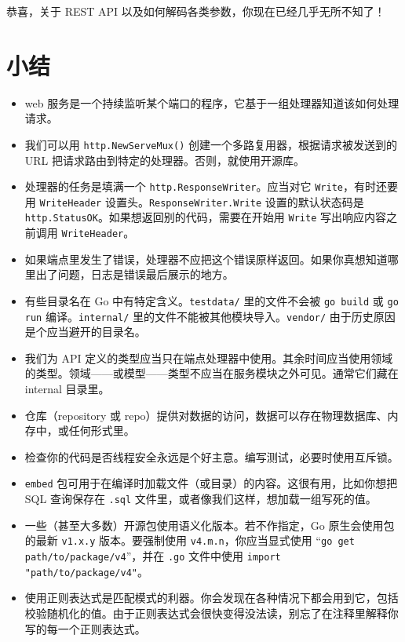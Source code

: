 恭喜，关于 REST API 以及如何解码各类参数，你现在已经几乎无所不知了！

\section*{小结}

\begin{itemize}
\item web 服务是一个持续监听某个端口的程序，它基于一组处理器知道该如何处理请求。
\item 我们可以用 \texttt{http.NewServeMux()} 创建一个多路复用器，根据请求被发送到的 URL 把请求路由到特定的处理器。否则，就使用开源库。

\item 处理器的任务是填满一个 \texttt{http.ResponseWriter}。应当对它 \texttt{Write}，有时还要用 \texttt{WriteHeader} 设置头。\texttt{ResponseWriter.Write} 设置的默认状态码是 \texttt{http.StatusOK}。如果想返回别的代码，需要在开始用 \texttt{Write} 写出响应内容之前调用 \texttt{WriteHeader}。
\item 如果端点里发生了错误，处理器不应把这个错误原样返回。如果你真想知道哪里出了问题，日志是错误最后展示的地方。
\item 有些目录名在 Go 中有特定含义。\texttt{testdata/} 里的文件不会被 \texttt{go build} 或 \texttt{go run} 编译。\texttt{internal/} 里的文件不能被其他模块导入。\texttt{vendor/} 由于历史原因是个应当避开的目录名。
\item 我们为 API 定义的类型应当只在端点处理器中使用。其余时间应当使用领域的类型。领域——或模型——类型不应当在服务模块之外可见。通常它们藏在 internal 目录里。
\item 仓库（repository 或 repo）提供对数据的访问，数据可以存在物理数据库、内存中，或任何形式里。
\item 检查你的代码是否线程安全永远是个好主意。编写测试，必要时使用互斥锁。
\item \texttt{embed} 包可用于在编译时加载文件（或目录）的内容。这很有用，比如你想把 SQL 查询保存在 \texttt{.sql} 文件里，或者像我们这样，想加载一组写死的值。
\item 一些（甚至大多数）开源包使用语义化版本。若不作指定，Go 原生会使用包的最新 \texttt{v1.x.y} 版本。要强制使用
\texttt{v4.m.n}，你应当显式使用 ``\texttt{go get path/to/package/v4}''，并在 \texttt{.go} 文件中使用 \texttt{import "path/to/package/v4"}。
\item 使用正则表达式是匹配模式的利器。你会发现在各种情况下都会用到它，包括校验随机化的值。由于正则表达式会很快变得没法读，别忘了在注释里解释你写的每一个正则表达式。

\end{itemize}
